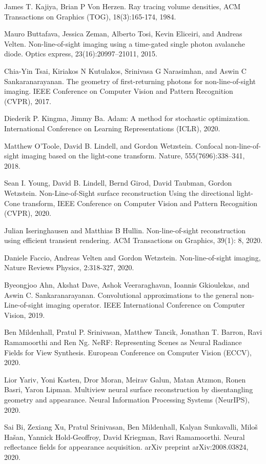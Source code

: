 \documentclass[10pt,journal,compsoc]{IEEEtran}
\begin{document}
\begin{thebibliography}{70}
 James T. Kajiya, Brian P Von Herzen. Ray tracing volume densities, ACM Transactions on Graphics (TOG), 18(3):165-174, 1984.

 Mauro Buttafava, Jessica Zeman, Alberto Tosi, Kevin Eliceiri, and Andreas Velten. Non-line-of-sight imaging using a time-gated single photon avalanche diode. Optics express, 23(16):20997–21011, 2015.

 Chia-Yin Tsai, Kiriakos N Kutulakos, Srinivasa G Narasimhan, and Aswin C Sankaranarayanan. The geometry of first-returning photons for non-line-of-sight imaging. IEEE Conference on Computer Vision and Pattern Recognition (CVPR), 2017.

 Diederik P. Kingma, Jimmy Ba. Adam: A method for stochastic optimization. International Conference on Learning Representations (ICLR), 2020.

 Matthew O’Toole, David B. Lindell, and Gordon Wetzstein.
Confocal non-line-of-sight imaging based on the light-cone transform. Nature, 555(7696):338–341, 2018.

 Sean I. Young, David B. Lindell, Bernd Girod, David Taubman, Gordon Wetzstein. Non-Line-of-Sight surface reconstruction Using the directional light-Cone transform, IEEE Conference on Computer Vision and Pattern Recognition (CVPR), 2020.

 Julian Iseringhausen and Matthias B Hullin. Non-line-of-sight reconstruction using efficient transient rendering. ACM Transactions on Graphics, 39(1): 8, 2020.

 Daniele Faccio, Andreas Velten and Gordon Wetzstein. Non-line-of-sight imaging, Nature Reviews Physics, 2:318-327, 2020.

 Byeongjoo Ahn, Akshat Dave, Ashok Veeraraghavan, Ioannis
Gkioulekas, and Aswin C. Sankaranarayanan. Convolutional approximations to the general non-Line-of-sight imaging operator. IEEE International Conference on Computer Vision, 2019.

 Ben Mildenhall, Pratul P. Srinivasan, Matthew Tancik, Jonathan T. Barron, Ravi Ramamoorthi and Ren Ng. NeRF: Representing Scenes as Neural Radiance Fields for View Synthesis. European Conference on Computer Vision (ECCV), 2020.

 Lior Yariv, Yoni Kasten, Dror Moran, Meirav Galun, Matan Atzmon, Ronen Basri, Yaron Lipman. Multiview neural surface reconstruction by disentangling geometry and appearance. Neural Information Processing Systems (NeurIPS), 2020.

 Sai Bi, Zexiang Xu, Pratul Srinivasan, Ben Mildenhall, Kalyan Sunkavalli, Miloš Hašan, Yannick Hold-Geoffroy, David Kriegman, Ravi Ramamoorthi. Neural reflectance fields for appearance acquisition. arXiv preprint arXiv:2008.03824, 2020.

\end{thebibliography}
\nocite{*}
% 
\end{document}

